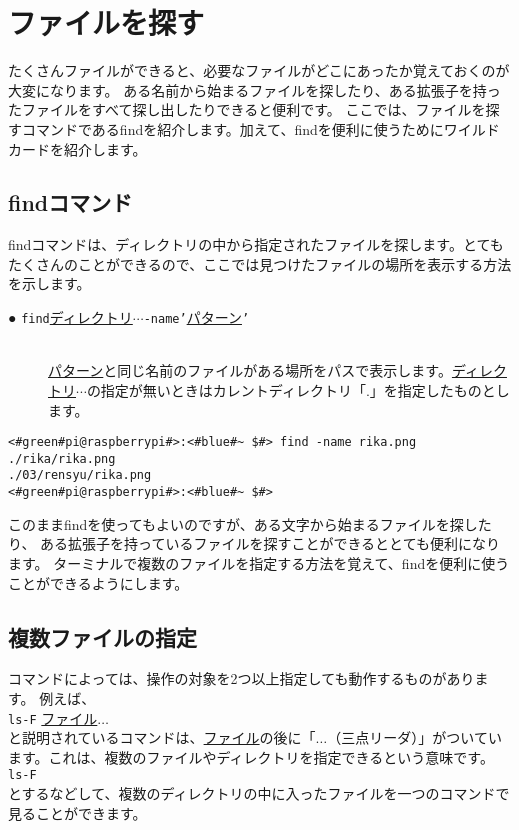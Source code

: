 \newpage
\section{ファイルを探す}
たくさんファイルができると、必要なファイルがどこにあったか覚えておくのが大変になります。
ある名前から始まるファイルを探したり、ある拡張子を持ったファイルをすべて探し出したりできると便利です。
ここでは、ファイルを探すコマンドであるfindを紹介します。加えて、findを便利に使うためにワイルドカードを紹介します。

\subsection{findコマンド}
findコマンドは、ディレクトリの中から指定されたファイルを探します。とてもたくさんのことができるので、ここでは見つけたファイルの場所を表示する方法を示します。

\begin{description}
    \item[● \texttt{find}\textvisiblespace \underline{ディレクトリ}$\cdots$\textvisiblespace \texttt{-name}\textvisiblespace \texttt{'}\underline{パターン}\texttt{'} ]\mbox{}\\ 
    \underline{パターン}と同じ名前のファイルがある場所をパスで表示します。\underline{ディレクトリ}$\cdots$の指定が無いときはカレントディレクトリ「.」を指定したものとします。
\end{description}

\begin{lstlisting}[caption=ワイルドカードの使い方, label=wildcard]
<#green#pi@raspberrypi#>:<#blue#~ $#> find -name rika.png
./rika/rika.png
./03/rensyu/rika.png
<#green#pi@raspberrypi#>:<#blue#~ $#>
\end{lstlisting}

このままfindを使ってもよいのですが、ある文字から始まるファイルを探したり、
ある拡張子を持っているファイルを探すことができるととても便利になります。
ターミナルで複数のファイルを指定する方法を覚えて、findを便利に使うことができるようにします。

\subsection{複数ファイルの指定}
コマンドによっては、操作の対象を2つ以上指定しても動作するものがあります。
例えば、\\
\texttt{ls}\textvisiblespace \texttt{-F} \underline{ファイル}$\ldots$\\
と説明されているコマンドは、\underline{ファイル}の後に「$\ldots$（三点リーダ）」がついています。これは、複数のファイルやディレクトリを指定できるという意味です。\\
\texttt{ls}\textvisiblespace \texttt{-F} \\
とするなどして、複数のディレクトリの中に入ったファイルを一つのコマンドで見ることができます。

